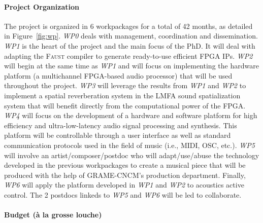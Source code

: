 \documentclass[a4paper,10pt]{article}
\newcommand{\F}{\textsc{Faust}}
\begin{document}
\paragraph{Project Organization}

The project is organized in 6 workpackages for a total of 42 months, as detailed in Figure~\ref{fig:wp}. \textit{WP0} deals with management, coordination and dissemination. \textit{WP1} is the heart of the project and the main focus of the PhD. It will deal with adapting the \F{} compiler to generate ready-to-use efficient FPGA IPs. \textit{WP2} will begin at the same time as \textit{WP1} and will focus on implementing the hardware platform (a multichannel FPGA-based audio processor) that will be used throughout the project. \textit{WP3} will leverage the results from \textit{WP1} and \textit{WP2} to implement a spatial reverberation system in the LMFA sound spatialization system that will benefit directly from the computational power of the FPGA. %
\textit{WP4} will focus on the development of a hardware and software platform for high efficiency and ultra-low-latency audio signal processing and synthesis. This platform will be controllable through a user interface as well as standard communication protocols used in the field of music (i.e., MIDI, OSC, etc.).
\textit{WP5} will involve an artist/composer/postdoc who will adapt/use/abuse the technology developed in the previous workpackages to create a musical piece that will be produced with the help of GRAME-CNCM's production department. %
Finally, \textit{WP6} will apply the platform developed in \textit{WP1} and \textit{WP2} to acoustics active control. The 2 postdocs linkeds to \textit{WP5} and \textit{WP6} will be led to collaborate. 

\paragraph{Budget (à la grosse louche)}


\end{document}
